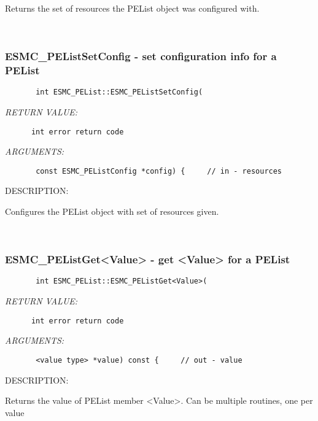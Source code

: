      Returns the set of resources the PEList object was configured with.
   
 
\mbox{}\hrulefill\ 
 
\subsubsection{ESMC\_PEListSetConfig - set configuration info for a PEList}


  
\begin{verbatim}       int ESMC_PEList::ESMC_PEListSetConfig(\end{verbatim}{\em RETURN VALUE:}
\begin{verbatim}      int error return code\end{verbatim}{\em ARGUMENTS:}
\begin{verbatim}       const ESMC_PEListConfig *config) {     // in - resources\end{verbatim}
{\sf DESCRIPTION:\\ }


      Configures the PEList object with set of resources given.
   
 
\mbox{}\hrulefill\ 
 
\subsubsection{ESMC\_PEListGet<Value> - get <Value> for a PEList}


  
\begin{verbatim}       int ESMC_PEList::ESMC_PEListGet<Value>(\end{verbatim}{\em RETURN VALUE:}
\begin{verbatim}      int error return code\end{verbatim}{\em ARGUMENTS:}
\begin{verbatim}       <value type> *value) const {     // out - value\end{verbatim}
{\sf DESCRIPTION:\\ }


       Returns the value of PEList member <Value>.
       Can be multiple routines, one per value
   
 
